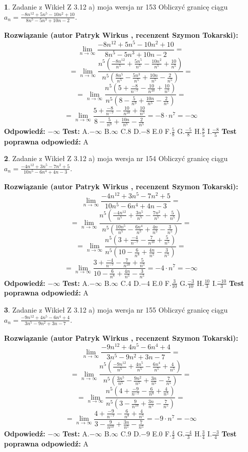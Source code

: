 \documentclass[12pt, a4paper]{article}
\theoremstyle{definition} %
\newtheorem{zad}{}
\newcommand{\zadStart}[1]{\begin{zad}#1\newline}
\newcommand{\zadStop}{\end{zad}}
\newcommand{\rozwStart}[2]{\noindent \textbf{Rozwiązanie (autor #1 , recenzent #2): }\newline}
\newcommand{\rozwStop}{\newline}
\newcommand{\odpStart}{\noindent \textbf{Odpowiedź:}\newline}
\newcommand{\odpStop}{\newline}
\newcommand{\testStart}{\noindent \textbf{Test:}\newline}
\newcommand{\testStop}{\newline}
\newcommand{\kluczStart}{\noindent \textbf{Test poprawna odpowiedź:}\newline}
\newcommand{\kluczStop}{\newline}
\begin{document}
\zadStart{Zadanie z Wikieł Z 3.12 a) moja wersja nr 153}
Obliczyć granicę ciągu $a_{n}=\frac{-8n^{12}+5n^{5}-10n^{2}+10}{8n^{5}-5n^{3}+10n-2}$.
\zadStop
\rozwStart{Patryk Wirkus}{Szymon Tokarski}
$$\lim\limits_{n\to\infty}\frac{-8n^{12}+5n^{5}-10n^{2}+10}{8n^{5}-5n^{3}+10n-2}=$$
$$=\lim\limits_{n\to\infty}\frac{n^{5}\left(\frac{-8n^{12}}{n^{5}}+\frac{5n^{5}}{n^{5}}-\frac{10n^{2}}{n^{5}}+\frac{10}{n^{5}}\right)}{n^{5}\left(\frac{8n^{5}}{n^{5}}-\frac{5n^{3}}{n^{5}}+\frac{10n}{n^{5}}-\frac{2}{n^{5}}\right)}=$$
$$=\lim\limits_{n\to\infty}\frac{n^{5}\left(5+\frac{-8}{n^{-7}}-\frac{10}{n^{10}}+\frac{10}{n^{5}}\right)}
{n^{5}\left(8-\frac{5}{n^{9}}+\frac{10n}{n^{5}}-\frac{2}{n^{5}}\right)}=$$
$$=\lim\limits_{n\to\infty}\frac{5+\frac{-8}{n^{-7}}-\frac{10}{n^{10}}+\frac{10}{n^{5}}}{8-\frac{5}{n^{9}}+\frac{10n}{n^{5}}-\frac{2}{n^{5}}}=-8\cdot n^{7} = -\infty$$
\rozwStop
\odpStart
$-\infty$
\odpStop
\testStart
A.$-\infty$
B.$\infty$
C.$8$
D.$-8$
E.$0$
F.$\frac{5}{8}$
G.$\frac{-5}{8}$
H.$\frac{8}{5}$
I.$\frac{-8}{5}$
\testStop
\kluczStart
A
\kluczStop



\zadStart{Zadanie z Wikieł Z 3.12 a) moja wersja nr 154}
Obliczyć granicę ciągu $a_{n}=\frac{-4n^{12}+3n^{5}-7n^{2}+5}{10n^{5}-6n^{4}+4n-3}$.
\zadStop
\rozwStart{Patryk Wirkus}{Szymon Tokarski}
$$\lim\limits_{n\to\infty}\frac{-4n^{12}+3n^{5}-7n^{2}+5}{10n^{5}-6n^{4}+4n-3}=$$
$$=\lim\limits_{n\to\infty}\frac{n^{5}\left(\frac{-4n^{12}}{n^{5}}+\frac{3n^{5}}{n^{5}}-\frac{7n^{2}}{n^{5}}+\frac{5}{n^{5}}\right)}{n^{5}\left(\frac{10n^{5}}{n^{5}}-\frac{6n^{4}}{n^{5}}+\frac{4n}{n^{5}}-\frac{3}{n^{5}}\right)}=$$
$$=\lim\limits_{n\to\infty}\frac{n^{5}\left(3+\frac{-4}{n^{-7}}-\frac{7}{n^{10}}+\frac{5}{n^{5}}\right)}
{n^{5}\left(10-\frac{6}{n^{8}}+\frac{4n}{n^{5}}-\frac{3}{n^{5}}\right)}=$$
$$=\lim\limits_{n\to\infty}\frac{3+\frac{-4}{n^{-7}}-\frac{7}{n^{10}}+\frac{5}{n^{5}}}{10-\frac{6}{n^{8}}+\frac{4n}{n^{5}}-\frac{3}{n^{5}}}=-4\cdot n^{7} = -\infty$$
\rozwStop
\odpStart
$-\infty$
\odpStop
\testStart
A.$-\infty$
B.$\infty$
C.$4$
D.$-4$
E.$0$
F.$\frac{3}{10}$
G.$\frac{-3}{10}$
H.$\frac{10}{3}$
I.$\frac{-10}{3}$
\testStop
\kluczStart
A
\kluczStop



\zadStart{Zadanie z Wikieł Z 3.12 a) moja wersja nr 155}
Obliczyć granicę ciągu $a_{n}=\frac{-9n^{12}+4n^{5}-6n^{4}+4}{3n^{5}-9n^{2}+3n-7}$.
\zadStop
\rozwStart{Patryk Wirkus}{Szymon Tokarski}
$$\lim\limits_{n\to\infty}\frac{-9n^{12}+4n^{5}-6n^{4}+4}{3n^{5}-9n^{2}+3n-7}=$$
$$=\lim\limits_{n\to\infty}\frac{n^{5}\left(\frac{-9n^{12}}{n^{5}}+\frac{4n^{5}}{n^{5}}-\frac{6n^{4}}{n^{5}}+\frac{4}{n^{5}}\right)}{n^{5}\left(\frac{3n^{5}}{n^{5}}-\frac{9n^{2}}{n^{5}}+\frac{3n}{n^{5}}-\frac{7}{n^{5}}\right)}=$$
$$=\lim\limits_{n\to\infty}\frac{n^{5}\left(4+\frac{-9}{n^{-7}}-\frac{6}{n^{8}}+\frac{4}{n^{5}}\right)}
{n^{5}\left(3-\frac{9}{n^{10}}+\frac{3n}{n^{5}}-\frac{7}{n^{5}}\right)}=$$
$$=\lim\limits_{n\to\infty}\frac{4+\frac{-9}{n^{-7}}-\frac{6}{n^{8}}+\frac{4}{n^{5}}}{3-\frac{9}{n^{10}}+\frac{3n}{n^{5}}-\frac{7}{n^{5}}}=-9\cdot n^{7} = -\infty$$
\rozwStop
\odpStart
$-\infty$
\odpStop
\testStart
A.$-\infty$
B.$\infty$
C.$9$
D.$-9$
E.$0$
F.$\frac{4}{3}$
G.$\frac{-4}{3}$
H.$\frac{3}{4}$
I.$\frac{-3}{4}$
\testStop
\kluczStart
A
\kluczStop
\end{document}
